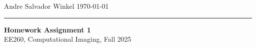 \documentclass[11pt]{article}
\begin{document}
\noindent Andre Salvador Winkel \hfill \today \\
\rule{\textwidth}{0.4pt}

\begin{center} \large {\textbf{Homework Assignment 1}} \\[0em] {EE260, Computational Imaging, Fall 2025} \end{center}




\end{document}
